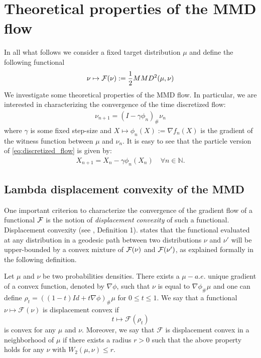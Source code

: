 \section{Theoretical properties of the MMD flow}\label{sec:theory}


In all what follows we consider a fixed target distribution $\mu$ and define the following functional 
\begin{align}\label{eq:MMD_functional}
	\nu \mapsto {{\mathcal F}}(\nu):=\frac{1}{2} MMD^2(\mu,\nu)\textbf{}
\end{align}
We investigate some theoretical properties of the MMD flow. In particular, we are interested in characterizing the convergence of the time discretized flow:
	\begin{align}\label{eq:discretized_flow}
		\nu_{n+1} = (I -\gamma \phi_n)_{\#}\nu_n
	\end{align}
where $\gamma$ is some fixed step-size and $X \mapsto \phi_n(X):=\nabla f_{n}(X)$ is the gradient of the witness function between $\mu$ and $\nu_n$. It is easy to see that the particle version of \cref{eq:discretized_flow} is given by:
\begin{align}
	X_{n+1} = X_n - \gamma \phi_n(X_n) \quad\forall n\in \mathbb{N}.
\end{align} 

\subsection{Lambda displacement convexity of the MMD}

One important criterion to characterize the convergence of the gradient flow of a functional ${{\mathcal F}}$ is the notion of \textit{displacement convexity} of such a functional. Displacement convexity (see \cite{Villani:2004}, Definition 1). states that the functional evaluated at any distribution in a geodesic path between two distributions $\nu$ and $\nu'$ will be upper-bounded by a convex mixture of ${{\mathcal F}}(\nu)$ and ${{\mathcal F}}(\nu')$, as explained formally in the following definition.
\begin{definition}\label{def:displacement_convexity}
 Let $\mu$
and $\nu$ be two probabilities densities. There exists a $\mu-a.e.$
unique gradient of a convex function, denoted by $\nabla\phi$, such that $\nu$
is equal to $\nabla\phi_{\#}\mu$ and one can define  $\rho_{t}=((1-t)Id+t\nabla\phi)_{\#}\mu$
for $0\leq t\leq1$. We say that a functional $\nu\mapsto\mathcal{F}(\nu)$
is displacement convex if 
\[
t\mapsto\mathcal{F}(\rho_{t})
\]
 is convex for any $\mu$ and $\nu$. Moreover, we say that $\mathcal{F}$
is displacement convex in a neighborhood of $\mu$ if there exists a radius $r>0$
such that the above property holds for any $\nu$ with $W_{2}(\mu,\nu)\leq r$.
\end{definition}


